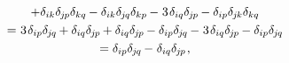\begin{multline*}
+ \delta_{ik} \delta_{\hspace{-0.1ex}j\hspace{-0.1ex}p} \delta_{kq} \hspace{-0.1ex}
- \delta_{ik} \delta_{\hspace{-0.1ex}j\hspace{-0.1ex}q} \delta_{kp} \hspace{-0.1ex}
- \hspace{.1ex} 3 \hspace{.2ex} \delta_{iq} \delta_{\hspace{-0.1ex}j\hspace{-0.1ex}p} \hspace{-0.1ex}
- \delta_{ip} \delta_{\hspace{-0.1ex}j\hspace{-0.1ex}k} \delta_{kq} %
\\
%
= \hspace{.1ex} 3 \hspace{.2ex} \delta_{ip} \delta_{\hspace{-0.1ex}j\hspace{-0.1ex}q} \hspace{-0.1ex}
+ \delta_{iq} \delta_{\hspace{-0.1ex}j\hspace{-0.1ex}p} \hspace{-0.1ex}
+ \delta_{iq} \delta_{\hspace{-0.1ex}j\hspace{-0.1ex}p} \hspace{-0.1ex}
- \delta_{ip} \delta_{\hspace{-0.1ex}j\hspace{-0.1ex}q} \hspace{-0.1ex}
- \hspace{.1ex} 3 \hspace{.2ex} \delta_{iq} \delta_{\hspace{-0.1ex}j\hspace{-0.1ex}p} \hspace{-0.1ex}
- \delta_{ip} \delta_{\hspace{-0.1ex}j\hspace{-0.1ex}q} %
\\
%
= \delta_{ip} \delta_{\hspace{-0.1ex}j\hspace{-0.1ex}q} \hspace{-0.1ex}
- \hspace{.1ex} \delta_{iq} \delta_{\hspace{-0.1ex}j\hspace{-0.1ex}p}
\hspace{.2ex} ,
\end{multline*}

